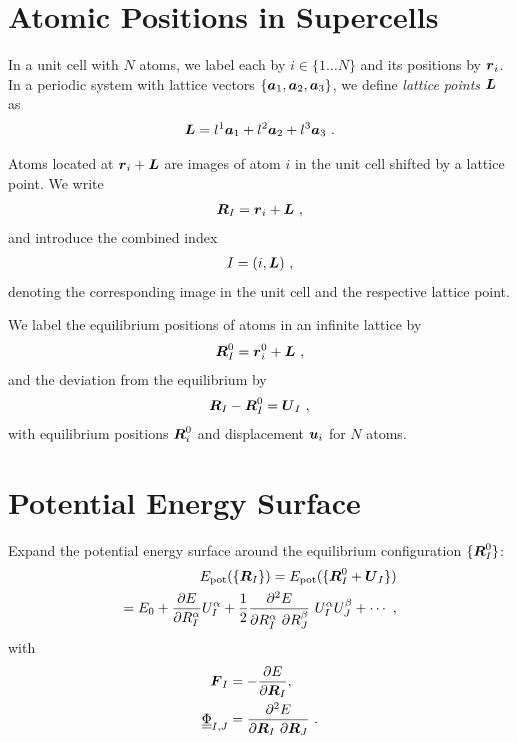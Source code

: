 
\section{Atomic Positions in Supercells}
\nid
In a unit cell with $N$ atoms, we label each by 
\mbox{$i \in \{1 \ldots N \}$} 
and its positions by 
$\boldsymbol{r}_i$. 
In a periodic system with lattice vectors 
$\{ \boldsymbol{a}_1, \boldsymbol{a}_2, \boldsymbol{a}_3 \}$, we define \emph{lattice points} $\boldsymbol{L}$ as
\begin{align}
\boldsymbol{L} = l^1 \boldsymbol{a}_1 + l^2 \boldsymbol{a}_2 + l^3 \boldsymbol{a}_3~.
\end{align}

\nid
Atoms located at $\boldsymbol{r}_i + \boldsymbol{L}$ are images of atom $i$ in the unit cell shifted by a 
lattice point. We write
\begin{align}
\boldsymbol{R}_I = \boldsymbol{r}_i + \boldsymbol{L} ~,
\label{def:R_I}
\end{align}
and introduce the combined index 
\begin{align}
I = (i, \boldsymbol{L})~,
\label{def:I}
\end{align}
denoting the corresponding image in 
the unit cell and the respective lattice point.

We label the equilibrium positions of atoms in an infinite lattice by
\begin{align}
\boldsymbol{R}_I^0 = \boldsymbol{r}_i^0 + \boldsymbol{L} ~,
\label{def:R_I0}
\end{align}
and the deviation from the equilibrium by
\begin{align}
\boldsymbol{R}_I - \boldsymbol{R}_I^0 = \boldsymbol{U}_I ~,
\label{def:u_i}
\end{align}
with equilibrium positions $\boldsymbol{R}_i^0$ and displacement $\boldsymbol{u}_i$ for $N$ 
atoms.

\section{Potential Energy Surface}
\nid
Expand the potential energy surface around the equilibrium configuration
$\{ \boldsymbol{R}_I^0 \}$:
\begin{align}
\begin{split}
E_{\text{pot}}( \{ \boldsymbol{R}_I \}) = E_{\text{pot}}( \{ \boldsymbol{R}_I^0 + \boldsymbol{U}_I \}) \\
= E_0 + \frac{\partial E}{\partial R_I^\alpha} U_I^\alpha
+ \frac{1}{2} \frac{\partial^2 E}{\partial R_I^\alpha~\partial R_J^\beta} 
~ U_I^\alpha U_J^\beta
+ \cdots~,
\end{split}
\end{align}
with
\begin{align}
\boldsymbol{F}_I &= - \frac{\partial E}{\partial \boldsymbol{R}_I}, \\
\underline{\underline{{\Phi}}}_{I,J}	&= \frac{\partial^2 E}{\partial \boldsymbol{R}_I ~ \partial \boldsymbol{R}_J}~.
\end{align}


